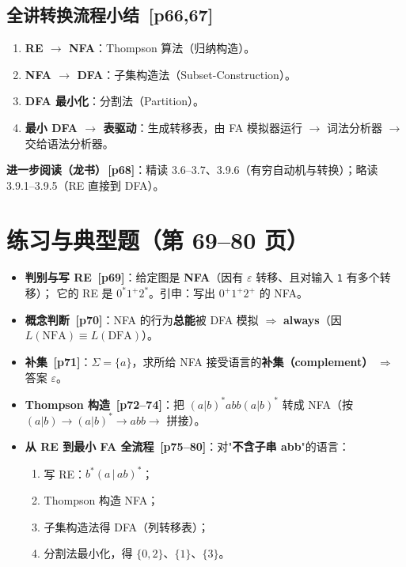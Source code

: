 \documentclass[UTF8,fontset=none,11pt]{ctexart}
\newcommand{\pg}[1]{{\small\color{gray}\,[p#1]}}
\begin{document}
\subsection{全讲转换流程小结 \pg{66,67}}
\begin{enumerate}
  \item \textbf{RE $\to$ NFA}：Thompson 算法（归纳构造）。
  \item \textbf{NFA $\to$ DFA}：子集构造法（Subset-Construction）。
  \item \textbf{DFA 最小化}：分割法（Partition）。
  \item \textbf{最小 DFA $\to$ 表驱动}：生成转移表，由 FA 模拟器运行 $\to$ 词法分析器 $\to$ 交给语法分析器。
\end{enumerate}
\textbf{进一步阅读（龙书）\pg{68}}：精读 3.6--3.7、3.9.6（有穷自动机与转换）；略读 3.9.1--3.9.5（RE 直接到 DFA）。

\section{练习与典型题（第 69--80 页）}
\begin{itemize}
  \item \textbf{判别与写 RE \pg{69}}：给定图是 \textbf{NFA}（因有 $\varepsilon$ 转移、且对输入 \texttt{1} 有多个转移）；
  它的 RE 是 $0^{*}1^{+}2^{*}$。引申：写出 $0^{+}1^{+}2^{+}$ 的 NFA。
  \item \textbf{概念判断 \pg{70}}：NFA 的行为\textbf{总能}被 DFA 模拟 $\Rightarrow$ \textbf{always}（因 $L(\text{NFA})\equiv L(\text{DFA})$）。
  \item \textbf{补集 \pg{71}}：$\Sigma=\{a\}$，求所给 NFA 接受语言的\textbf{补集（complement）} $\Rightarrow$ 答案 $\varepsilon$。
  \item \textbf{Thompson 构造 \pg{72--74}}：把 $(a|b)^{*}abb(a|b)^{*}$ 转成 NFA（按 $(a|b)\to(a|b)^{*}\to abb\to$ 拼接）。
  \item \textbf{从 RE 到最小 FA 全流程 \pg{75--80}}：对"\textbf{不含子串 abb}"的语言：
  \begin{enumerate}
    \item 写 RE：$b^{*}(a\,|\,ab)^{*}$；
    \item Thompson 构造 NFA；
    \item 子集构造法得 DFA（列转移表）；
    \item 分割法最小化，得 $\{0,2\}$、$\{1\}$、$\{3\}$。
  \end{enumerate}
\end{itemize}
\end{document}

